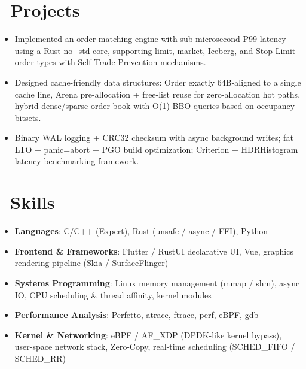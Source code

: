 \documentclass{resume}
\begin{document}
\section{\faCode\  Projects}
\begin{onehalfspacing}
\begin{itemize}
  \item Implemented an order matching engine with sub-microsecond P99 latency using a Rust no\_std core, supporting limit, market, Iceberg, and Stop-Limit order types with Self-Trade Prevention mechanisms.
  \item Designed cache-friendly data structures: Order exactly 64B-aligned to a single cache line, Arena pre-allocation + free-list reuse for zero-allocation hot paths, hybrid dense/sparse order book with O(1) BBO queries based on occupancy bitsets.
  \item Binary WAL logging + CRC32 checksum with async background writes; fat LTO + panic=abort + PGO build optimization; Criterion + HDRHistogram latency benchmarking framework.
\end{itemize}
\end{onehalfspacing}


\section{\faCogs\  Skills}
\begin{itemize}[parsep=0.5ex]
    \item \textbf{Languages}: C/C++ (Expert), Rust (unsafe / async / FFI), Python
    \item \textbf{Frontend \& Frameworks}: Flutter / RustUI declarative UI, Vue, graphics rendering pipeline (Skia / SurfaceFlinger)
    \item \textbf{Systems Programming}: Linux memory management (mmap / shm), async IO, CPU scheduling \& thread affinity, kernel modules
    \item \textbf{Performance Analysis}: Perfetto, atrace, ftrace, perf, eBPF, gdb
    \item \textbf{Kernel \& Networking}: eBPF / AF\_XDP (DPDK-like kernel bypass), user-space network stack, Zero-Copy, real-time scheduling (SCHED\_FIFO / SCHED\_RR)
\end{itemize}
\end{document}
